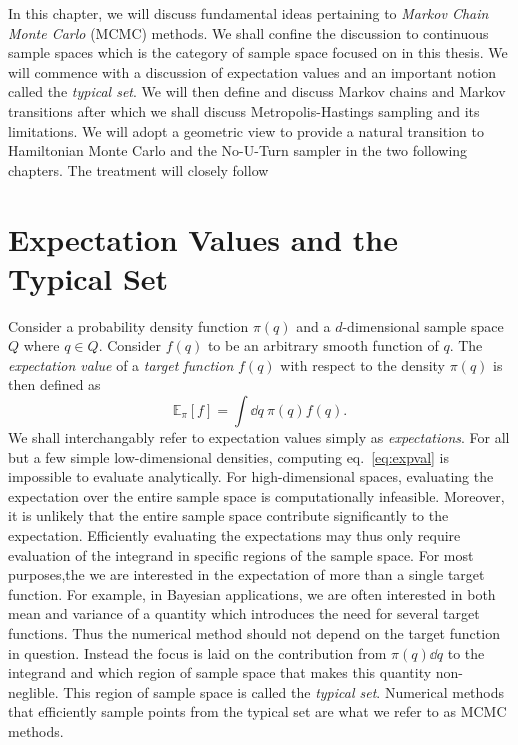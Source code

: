 In this chapter, we will discuss fundamental ideas pertaining to \textit{Markov Chain Monte Carlo} (MCMC) methods.
We shall confine the discussion to continuous sample spaces which is the category of sample space focused on in this thesis.
We will commence with a discussion of expectation values and an important notion called the \textit{typical set}. 
We will then define and discuss Markov chains and Markov transitions after which we shall
discuss Metropolis-Hastings sampling and its limitations. 
We will adopt a geometric view to provide a natural transition to Hamiltonian Monte Carlo and the No-U-Turn sampler
in the two following chapters. The treatment will closely follow \cite{conceptual_intro_hmc}

\section{Expectation Values and the Typical Set}
Consider a probability density function $\pi(q)$ and a $d$-dimensional sample space $Q$ where $q \in Q$. Consider $f(q)$ to be an arbitrary smooth
function of $q$. The \textit{expectation value} of a \textit{target function} $f(q)$ with respect to the density $\pi(q)$ is then defined as
\begin{equation}\label{eq:expval}
    \mathbb{E}_\pi[f] = \int \dd q \ \pi(q) f(q).
\end{equation}
We shall interchangably refer to expectation values simply as \textit{expectations}.
For all but a few simple low-dimensional densities, computing eq.~\eqref{eq:expval} is impossible to evaluate analytically. 
For high-dimensional spaces, evaluating the expectation over the entire sample space is computationally infeasible.
Moreover, it is unlikely that the entire sample space contribute significantly to the expectation. Efficiently
evaluating the expectations may thus only require evaluation of the integrand in specific regions of the sample space.
For most purposes,the we are interested in the expectation of more than a single target function. For example, in Bayesian applications,
we are often interested in both mean and variance of a quantity which introduces the need for several target functions. 
Thus the numerical method should not depend on the target function in question. 
Instead the focus is laid on the contribution from $\pi(q)\dd q$ to
the integrand and which region of sample space that makes this quantity non-neglible. This region of sample space
is called the \textit{typical set}. Numerical methods that efficiently sample points from the typical set are what
we refer to as MCMC methods.

